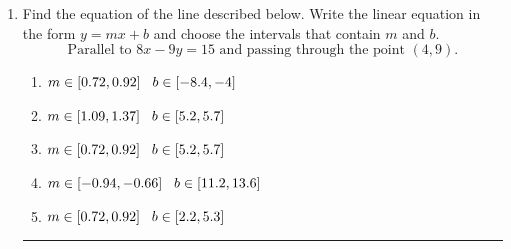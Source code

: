 \documentclass[14pt]{extbook}
\newcommand{\litem}[1]{\item#1\hspace*{-1cm}\rule{\textwidth}{0.4pt}}
\begin{document}
\begin{enumerate}
{\begin{enumerate}[label=\Alph*.]
\end{enumerate} }
\litem{
Find the equation of the line described below. Write the linear equation in the form $ y=mx+b $ and choose the intervals that contain $m$ and $b$.\[ \text{Parallel to } 8 x - 9 y = 15 \text{ and passing through the point } (4, 9). \]\begin{enumerate}[label=\Alph*.]
\item \( m \in [0.72, 0.92] \hspace*{3mm} b \in [-8.4, -4] \)
\item \( m \in [1.09, 1.37] \hspace*{3mm} b \in [5.2, 5.7] \)
\item \( m \in [0.72, 0.92] \hspace*{3mm} b \in [5.2, 5.7] \)
\item \( m \in [-0.94, -0.66] \hspace*{3mm} b \in [11.2, 13.6] \)
\item \( m \in [0.72, 0.92] \hspace*{3mm} b \in [2.2, 5.3] \)

\end{enumerate} }
\end{enumerate}
\end{document}
